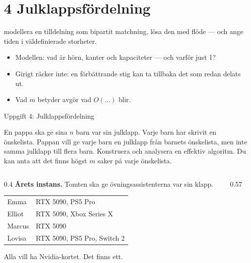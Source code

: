 \section{4 Julklappsfördelning}

{modellera en tilldelning som bipartit matchning, lösa den med flöde — och ange tiden i
väldefinierade storheter.}
{\begin{itemize}\setlength{\itemsep}{1pt}
  \item Modellen: vad är hörn, kanter och kapaciteter — och varför just 1?
  \item Girigt räcker inte: en förbättrande stig kan ta tillbaka det som redan delats ut.
  \item Vad $m$ betyder avgör vad $O(\dots)$ blir.
\end{itemize}}

\begin{frame}{Uppgift 4: Julklappsfördelning}
\begin{infobox}[fontupper=\footnotesize]
En pappa ska ge sina $n$ barn var sin julklapp. Varje barn har skrivit en önskelista. Pappan vill
ge varje barn en julklapp från barnets önskelista, men inte samma julklapp till flera barn.
Konstruera och analysera en effektiv algoritm. Du kan anta att det finns högst $m$ saker på
varje önskelista.
\end{infobox}
\begin{columns}[T]
\begin{column}{0.4\textwidth}
\small
\textbf{Årets instans.} Tomten ska ge övningsassistenterna var sin klapp.\par\smallskip
\footnotesize
\renewcommand{\arraystretch}{1.15}
\begin{tabular}{@{}ll@{}}
\toprule
Emma & RTX 5090, PS5 Pro\\
Elliot & RTX 5090, Xbox Series X\\
Marcus & RTX 5090\\
Lovisa & RTX 5090, PS5 Pro, Switch 2\\
\bottomrule
\end{tabular}\par\smallskip
Alla vill ha Nvidia-kortet. Det finns ett.
\end{column}
\begin{column}{0.57\textwidth}
\centering

\end{column}
\end{columns}
\end{frame}

